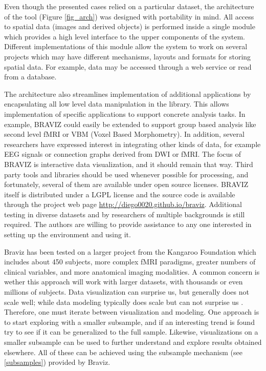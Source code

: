 \documentclass[twocolumn]{svjour3}
\begin{document}
Even though the presented cases relied on a particular dataset, the architecture of the tool (Figure \ref{fig_arch}) was designed with portability in mind. All access to spatial data (images and derived objects) is performed inside a single module which provides a high level interface to the upper components of the system. Different implementations of this module  allow the system to work on several projects which may have different mechanisms, layouts and formats for storing spatial data. For example, data may be accessed through a web service or read from a database. 

The architecture  also streamlines implementation of additional applications by encapsulating all low level data manipulation in the library. This allows implementation of specific applications to support concrete analysis tasks. In example, BRAVIZ could easily be extended to support group based analysis like second level fMRI or VBM (Voxel Based Morphometry). In addition, several researchers have expressed  interest in integrating other kinds of data, for example EEG signals or connection graphs \cite{rubinov_complex_2010} derived from DWI or fMRI.  
The focus of BRAVIZ is interactive data visualization, and it should remain that way. Third party tools and libraries should be used whenever possible for processing, and fortunately, several of them are available under open source licenses. BRAVIZ itself is distributed under a LGPL license and the source code is available through the project web page \url{http://diego0020.github.io/braviz}. Additional testing in diverse datasets and by researchers of multiple backgrounds is still required. The authors are willing to provide assistance to any one interested in setting up the environment and using it. 

Braviz has been tested on a larger project from the Kangaroo Foundation which includes about 450 subjects, more complex fMRI paradigms, greater numbers of clinical variables, and more anatomical imaging modalities. A common concern is wether this approach will work with larger datasets, with thousands or even millions of subjects. Data visualization can surprise us, but generally does not scale well; while data modeling typically does scale but can not surprise us \cite{grolemund_r_2016}. Therefore, one must iterate between visualization and modeling. One approach is to start exploring with a smaller subsample, and if an interesting trend is found try to see if it can be generalized to the full sample. Likewise, visualizations on a smaller subsample can be used to further understand and explore results obtained elsewhere. All of these can be achieved using the subsample mechanism (see \ref{subsamples}) provided by Braviz.
  
\end{document}
